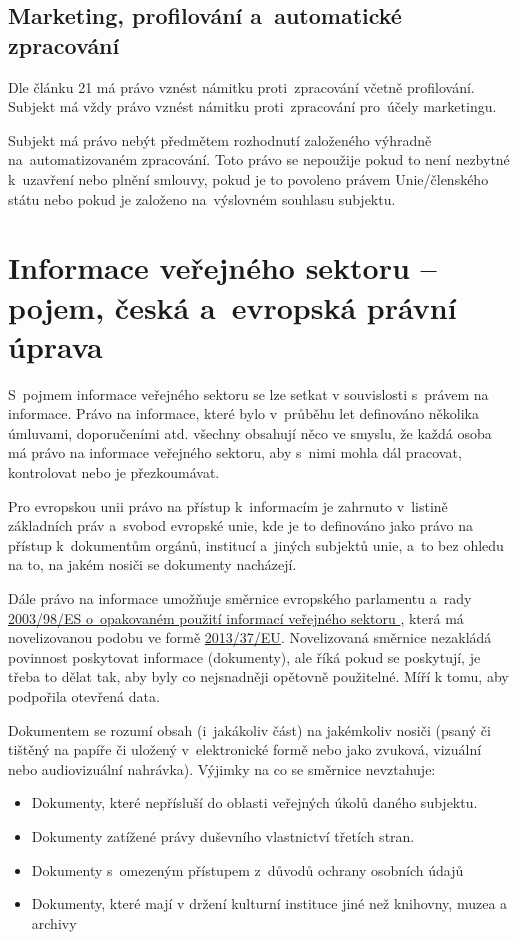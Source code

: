 \subsection*{Marketing, profilování a~automatické zpracování}

Dle článku 21 má právo vznést námitku proti~zpracování včetně profilování. Subjekt má vždy právo vznést námitku proti~zpracování pro~účely marketingu.

Subjekt má právo nebýt předmětem rozhodnutí založeného výhradně na~automatizovaném zpracování. Toto právo se nepoužije pokud to není nezbytné k~uzavření nebo plnění smlouvy, pokud je to povoleno právem Unie/členského státu nebo pokud je založeno na~výslovném souhlasu subjektu.

\clearpage
\section{Informace veřejného sektoru -- pojem, česká a~evropská právní úprava}

S~pojmem informace veřejného sektoru se lze setkat v souvislosti s~právem na informace. Právo na informace, které bylo v~průběhu let definováno několika úmluvami, doporučeními atd. všechny obsahují něco ve smyslu, že každá osoba má právo na informace veřejného sektoru, aby s~nimi mohla dál pracovat, kontrolovat nebo je přezkoumávat.

Pro evropskou unii právo na přístup k~informacím je zahrnuto v~listině základních práv a~svobod evropské unie, kde je to definováno jako právo na přístup k~dokumentům orgánů, institucí a~jiných subjektů unie, a~to bez ohledu na to, na jakém nosiči se dokumenty nacházejí. 

Dále právo na informace umožňuje směrnice evropského parlamentu a~rady \href{https://eur-lex.europa.eu/legal-content/CS/TXT/?uri=celex\%3A32003L0098}{2003/98/ES o~opakovaném použití informací veřejného sektoru }, která má novelizovanou podobu ve formě \href{https://eur-lex.europa.eu/legal-content/EN/TXT/?uri=CELEX\%3A02003L0098-20130717}{2013/37/EU}. Novelizovaná směrnice nezakládá povinnost poskytovat informace (dokumenty), ale říká pokud se poskytují, je třeba to dělat tak, aby byly co nejsnadněji opětovně použitelné. Míří k tomu, aby podpořila otevřená data. 

Dokumentem se rozumí obsah (i~jakákoliv část) na jakémkoliv nosiči (psaný či tištěný na papíře či uložený v~elektronické formě nebo jako zvuková, vizuální nebo audiovizuální nahrávka).
Výjimky na co se směrnice nevztahuje:
\begin{itemize}[noitemsep]
    \item Dokumenty, které nepřísluší do oblasti veřejných úkolů daného subjektu.
    \item Dokumenty zatížené právy duševního vlastnictví třetích stran.
    \item Dokumenty s~omezeným přístupem z~důvodů ochrany osobních údajů
    \item Dokumenty, které mají v držení kulturní instituce jiné než knihovny, muzea a archivy
\end{itemize}

